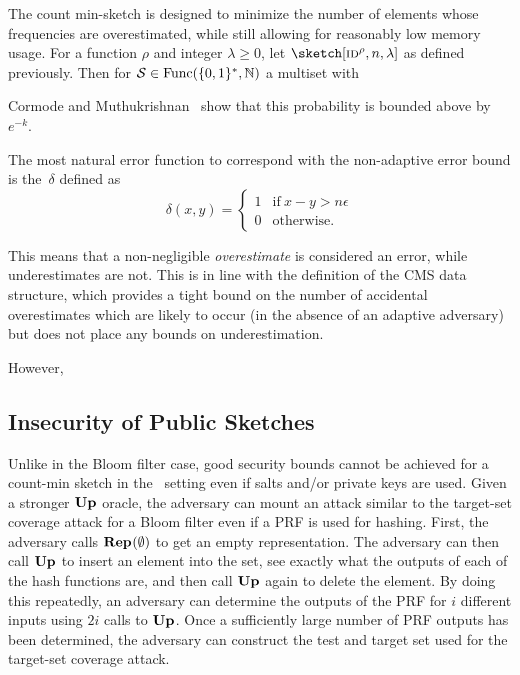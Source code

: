 %
The count min-sketch is designed to minimize the number of elements whose
frequencies are overestimated, while still allowing for reasonably low memory
usage. For a function $\rho$ and integer $\lambda\ge0$, let
$\sketch[\id^\rho,n,\lambda]$ as defined previously. Then for
$\mathcal{S} \in \mathrm{Func}(\{0,1\}^*,\mathbb{N})$ a multiset with %

Cormode and Muthukrishnan~\cite{cormode2005improved} show that this probability
is bounded above by $e^{-k}$.

%
The most natural error function to correspond with the non-adaptive error bound
is the~$\delta$ defined as
\begin{equation}
  \delta(x, y) =
  \begin{cases}
    1 & \text{if}\ x - y > n\epsilon \\
    0 & \text{otherwise.}
  \end{cases}
\end{equation}

This means that a non-negligible \emph{overestimate} is considered an error,
while underestimates are not. This is in line with the definition of the CMS
data structure, which provides a tight bound on the number of accidental
overestimates which are likely to occur (in the absence of an adaptive
adversary) but does not place any bounds on underestimation.

However, 

\subsection{Insecurity of Public Sketches}

Unlike in the Bloom filter case, good security bounds cannot be achieved for a
count-min sketch in the \errep\ setting even if salts and/or private keys are
used. Given a stronger $\textup{\textbf{Up}}\hspace{0.5pt}$ oracle, the adversary can mount an attack similar
to the target-set coverage attack for a Bloom filter even if a PRF is used for
hashing. First, the adversary calls $\textup{\textbf{Rep}}\hspace{0.5pt}(\emptyset)$ to get an empty
representation. The adversary can then call $\textup{\textbf{Up}}\hspace{0.5pt}$ to insert an element into the
set, see exactly what the outputs of each of the hash functions are, and then
call $\textup{\textbf{Up}}\hspace{0.5pt}$ again to delete the element. By doing this repeatedly, an adversary
can determine the outputs of the PRF for $i$ different inputs using $2i$ calls
to $\textup{\textbf{Up}}\hspace{0.5pt}$. Once a sufficiently large number of PRF outputs has been determined,
the adversary can construct the test and target set used for the target-set
coverage attack.

